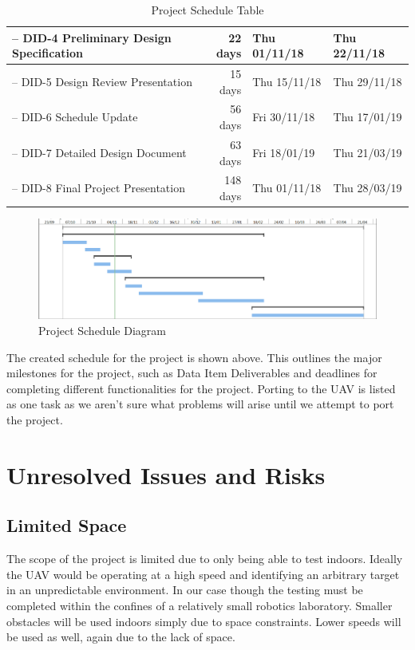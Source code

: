 \documentclass{article}
\begin{document}
\begin{table}[]
\begin{tabular}{|l|r|l|l|}
		-- DID-4 Preliminary Design Specification	    & 22 days		& Thu 01/11/18		& Thu 22/11/18		\\ \hline
		-- DID-5 Design Review Presentation		    & 15 days		& Thu 15/11/18		& Thu 29/11/18		\\ \hline
		-- DID-6 Schedule Update			    & 56 days		& Fri 30/11/18		& Thu 17/01/19		\\ \hline
		-- DID-7 Detailed Design Document		    & 63 days		& Fri 18/01/19		& Thu 21/03/19		\\ \hline
		-- DID-8 Final Project Presentation		    & 148 days		& Thu 01/11/18		& Thu 28/03/19		\\ \hline

	\end{tabular}
	\caption{Project Schedule Table}
	\label{table:projectscheduletable}
\end{table}

\begin{figure}
	\centering
	\includegraphics[width=\linewidth]{ScheduleDiagram}
	\caption{Project Schedule Diagram}
	\label{fig:schedulediagram}
\end{figure}

The created schedule for the project is shown above. This outlines the major milestones for the project, such as Data Item Deliverables and deadlines for completing different functionalities for the project. Porting to the UAV is listed as one task as we aren't sure what problems will arise until we attempt to port the project.  

\section{Unresolved Issues and Risks}

	\subsection{Limited Space}
	The scope of the project is limited due to only being able to test indoors. Ideally the UAV would be operating at a high speed and identifying an arbitrary target in an unpredictable environment. In our case though the testing must be completed within the confines of a relatively small robotics laboratory. Smaller obstacles will be used indoors simply due to space constraints. Lower speeds will be used as well, again due to the lack of space. 
\end{document}
